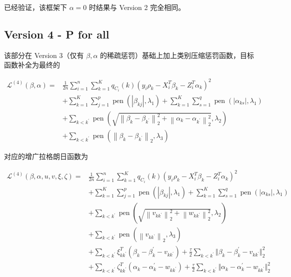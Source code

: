 \documentclass[12pt, a4paper, oneside]{article}
\numberwithin{equation}{section}
\begin{document}
已经验证，该框架下 $\alpha=0$ 时结果与 Version 2 完全相同。

\subsection{Version 4 - P for all}

该部分在 Version 3（仅有 $\beta, \alpha$ 的稀疏惩罚）基础上加上类别压缩惩罚函数，目标函数补全为最终的

\begin{equation}
	\begin{aligned}
		\mathcal{L}^{(4)}(\beta,\alpha)=&\frac{1}{2n}\sum_{i=1}^{n}\sum_{k=1}^{K} q_{C_i}(k)\left(y_i\rho_k - X_i^T \beta_k - Z_i^T \alpha_k \right)^2 \\
		&+ \sum_{k=1}^{K}\sum_{j=1}^{p} \operatorname{pen}\left(|\beta_{kj}|, \lambda_{1}\right) + \sum_{k=1}^{K}\sum_{s=1}^{q} \operatorname{pen}\left(|\alpha_{ks}|, \lambda_{1}\right)\\
		&+\sum_{k<k^{\prime}} \operatorname{pen}\left(\sqrt{\left\|\beta_{k}-\beta_{k^{\prime}}\right\|_{2}^{2}+\left\|\alpha_{k}-\alpha_{k^{\prime}}\right\|_{2}^{2}}, \lambda_{2}\right) \\
		&+\sum_{k<k^{\prime}} \operatorname{pen}\left(\left\|\beta_{k}-\beta_{k^{\prime}}\right\|_{2}, \lambda_{3}\right)
	\end{aligned}
\end{equation}

对应的增广拉格朗日函数为

\begin{equation}
	\begin{aligned}
		\mathcal{L}^{(4)}(\beta,\alpha,u,v,\xi,\zeta)=&\frac{1}{2n}\sum_{i=1}^{n}\sum_{k=1}^{K} q_{C_i}(k)\left(y_i\rho_k - X_i^T \beta_k - Z_i^T \alpha_k \right)^2 \\
		&+ \sum_{k=1}^{K}\sum_{j=1}^{p} \operatorname{pen}\left(|\beta_{kj}|, \lambda_{1}\right) + \sum_{k=1}^{K}\sum_{s=1}^{q} \operatorname{pen}\left(|\alpha_{ks}|, \lambda_{1}\right)\\
		&+ \sum_{k<k^{\prime}} \operatorname{pen}\left(\sqrt{\left\|v_{kk^\prime}\right\|_{2}^{2}+\left\|w_{kk^\prime}\right\|_{2}^{2}}, \lambda_{2}\right) \\
		&+ \sum_{k<k^{\prime}} \operatorname{pen}\left(\left\|v_{kk^\prime}\right\|_{2}, \lambda_{3}\right) \\
		&+ \sum_{k<k^{\prime}} \xi_{kk^{\prime}}^T(\beta_k - \beta_k^\prime - v_{kk^\prime}) + \frac{\tau}{2}\sum_{k<k^{\prime}}\Vert\beta_k - \beta_k^\prime - v_{kk^\prime}\Vert^2_2 \\
		&+ \sum_{k<k^{\prime}} \zeta_{kk^{\prime}}^T(\alpha_k - \alpha_k^\prime - w_{kk^\prime}) + \frac{\tau}{2}\sum_{k<k^{\prime}}\Vert\alpha_k - \alpha_k^\prime - w_{kk^\prime}\Vert^2_2
	\end{aligned}
\end{equation}
\end{document}
